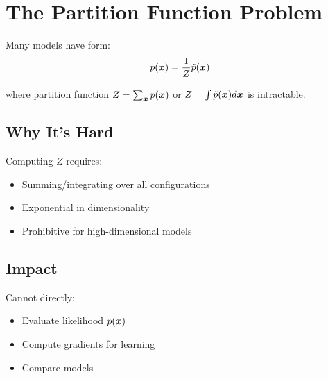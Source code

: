 
\section{The Partition Function Problem}
\label{sec:partition-problem}

Many models have form:
\begin{equation}
p(\boldsymbol{x}) = \frac{1}{Z} \tilde{p}(\boldsymbol{x})
\end{equation}

where partition function $Z = \sum_{\boldsymbol{x}} \tilde{p}(\boldsymbol{x})$ or $Z = \int \tilde{p}(\boldsymbol{x}) d\boldsymbol{x}$ is intractable.

\subsection{Why It's Hard}

Computing $Z$ requires:
\begin{itemize}
    \item Summing/integrating over all configurations
    \item Exponential in dimensionality
    \item Prohibitive for high-dimensional models
\end{itemize}

\subsection{Impact}

Cannot directly:
\begin{itemize}
    \item Evaluate likelihood $p(\boldsymbol{x})$
    \item Compute gradients for learning
    \item Compare models
\end{itemize}

